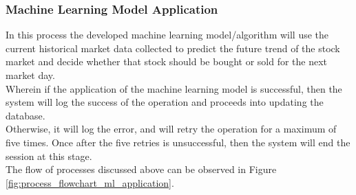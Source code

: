\subsubsection{Machine Learning Model Application}
\label{subsubsec:ml_application}
In this process the developed machine learning model/algorithm will use the 
current historical market data collected to predict the future trend of the 
stock market and decide whether that stock should be bought or sold for 
the next market day.
\hfill \\

Wherein if the application of the machine learning model is successful, 
then the system will log the success of the operation and proceeds into 
updating the database.
\hfill \\

Otherwise, it will log the error, and will retry the operation for a 
maximum of five times. Once after the five retries is unsuccessful, 
then the system will end the session at this stage.
\hfill \\

The flow of processes discussed above can be 
observed in Figure \ref{fig:process_flowchart_ml_application}.

